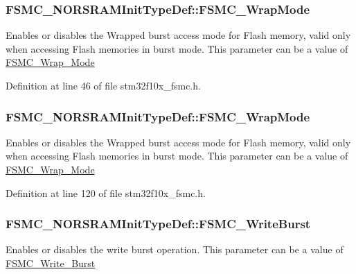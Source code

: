 \subsubsection[{\texorpdfstring{F\+S\+M\+C\+\_\+\+Wrap\+Mode}{FSMC_WrapMode}}]{ F\+S\+M\+C\+\_\+\+N\+O\+R\+S\+R\+A\+M\+Init\+Type\+Def\+::\+F\+S\+M\+C\+\_\+\+Wrap\+Mode}\hypertarget{struct_f_s_m_c___n_o_r_s_r_a_m_init_type_def_a2d66760f848173beb379b9be341260a5}{}\label{struct_f_s_m_c___n_o_r_s_r_a_m_init_type_def_a2d66760f848173beb379b9be341260a5}
Enables or disables the Wrapped burst access mode for Flash memory, valid only when accessing Flash memories in burst mode. This parameter can be a value of \hyperlink{group___f_s_m_c___wrap___mode}{F\+S\+M\+C\+\_\+\+Wrap\+\_\+\+Mode} 

Definition at line 46 of file stm32f10x\+\_\+fsmc.\+h.

\subsubsection[{\texorpdfstring{F\+S\+M\+C\+\_\+\+Wrap\+Mode}{FSMC_WrapMode}}]{ F\+S\+M\+C\+\_\+\+N\+O\+R\+S\+R\+A\+M\+Init\+Type\+Def\+::\+F\+S\+M\+C\+\_\+\+Wrap\+Mode}\hypertarget{struct_f_s_m_c___n_o_r_s_r_a_m_init_type_def_a7e201c17bf7c5f6cc69fb6de29c8b024}{}\label{struct_f_s_m_c___n_o_r_s_r_a_m_init_type_def_a7e201c17bf7c5f6cc69fb6de29c8b024}
Enables or disables the Wrapped burst access mode for Flash memory, valid only when accessing Flash memories in burst mode. This parameter can be a value of \hyperlink{group___f_s_m_c___wrap___mode}{F\+S\+M\+C\+\_\+\+Wrap\+\_\+\+Mode} 

Definition at line 120 of file stm32f10x\+\_\+fsmc.\+h.

\subsubsection[{\texorpdfstring{F\+S\+M\+C\+\_\+\+Write\+Burst}{FSMC_WriteBurst}}]{ F\+S\+M\+C\+\_\+\+N\+O\+R\+S\+R\+A\+M\+Init\+Type\+Def\+::\+F\+S\+M\+C\+\_\+\+Write\+Burst}\hypertarget{struct_f_s_m_c___n_o_r_s_r_a_m_init_type_def_a52964222ffe30f48ad128975ae750aed}{}\label{struct_f_s_m_c___n_o_r_s_r_a_m_init_type_def_a52964222ffe30f48ad128975ae750aed}
Enables or disables the write burst operation. This parameter can be a value of \hyperlink{group___f_s_m_c___write___burst}{F\+S\+M\+C\+\_\+\+Write\+\_\+\+Burst} 

